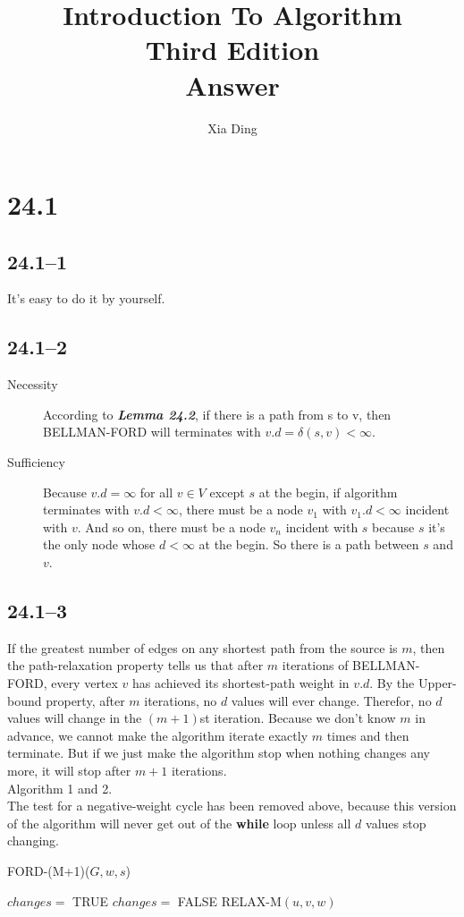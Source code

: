 \documentclass{article}
\author{Xia Ding}
\title{\textbf{Introduction To Algorithm}\\Third Edition\\\textbf{Answer}}
\begin{document}
\maketitle
\section*{24.1}
\subsection*{24.1--1}
It's easy to do it by yourself.

\subsection*{24.1--2}
\begin{description}
\item[Necessity ] According to \textit{\textbf{Lemma 24.2}}, if there is a
path from s to v, then BELLMAN-FORD will terminates with $v.d = \delta(s, v) <\infty$.
\item[Sufficiency ] Because $v.d = \infty$ for all $v\in{V}$ except $s$ at the
begin, if algorithm terminates with $v.d < \infty$, there must be a node $v_1$
with $v_1.d < \infty$ incident with $v$. And so on, there must be a node $v_n$
incident with $s$ because $s$ it's the only node whose $d < \infty$ at the begin. So there is a path between $s$ and $v$.
\end{description}

\subsection*{24.1--3}
If the greatest number of edges on any shortest path from the source is $m$, then the path-relaxation property tells us that after $m$ iterations of BELLMAN-FORD, every vertex $v$ has achieved its shortest-path weight in $v.d$. By the Upper-bound property, after $m$ iterations, no $d$ values will ever change. Therefor, no $d$ values will change in the $(m + 1)$st iteration. Because we don't know $m$ in advance, we cannot make the algorithm iterate exactly $m$ times and then terminate. But if we just make the algorithm stop when nothing changes any more, it will stop after $m + 1$ iterations.\\
Algorithm 1 and 2.\\
The test for a negative-weight cycle has been removed above, because this version of the algorithm will never get out of the \textbf{while} loop unless all $d$ values stop changing.
\begin{algorithm}
  \caption{FORD-(M+1)($G, w, s$)}
  \begin{algorithmic}[1]
    \STATE $changes =$ TRUE
    \STATE $changes =$ FALSE
    \STATE RELAX-M$(u, v, w)$
    \ENDFOR
    \ENDWHILE
  \end{algorithmic}
\end{algorithm}
\end{document}
